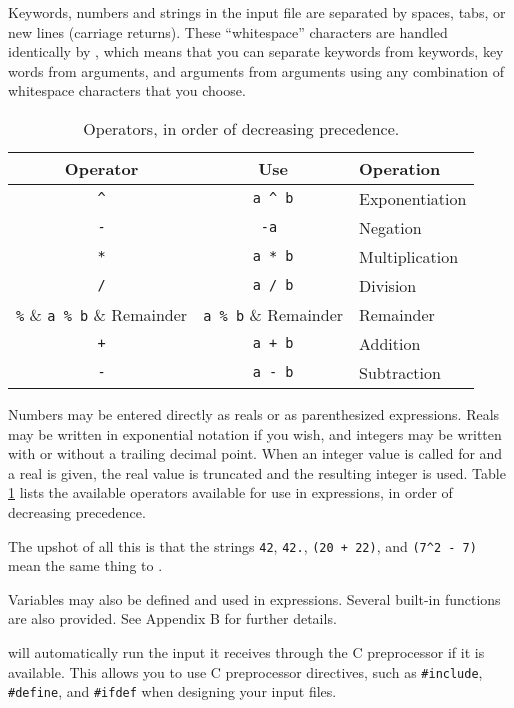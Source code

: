 Keywords, numbers and strings in the input file are separated by spaces,
tabs, or new lines (carriage returns).  These ``whitespace'' characters
are handled identically by {\rayshade}, which means that you can separate
keywords from keywords, key words from arguments, and arguments from
arguments using any combination of whitespace characters that you choose.

\begin{table}
\centering
\begin{tabular}{|c|c|l|}\hline\hline
Operator &    Use    & Operation \\ \hline \hline
\verb+^+ &  \verb!a ^ b!  & Exponentiation \\  \hline
\verb+-+ &  \verb! -a  !  & Negation  \\   \hline
\verb+*+ &  \verb!a * b!  & Multiplication  \\  \hline
\verb+/+ &  \verb!a / b!  & Division     \\  \hline
\verb+%+ &  \verb!a % b!  & Remainder    \\  \hline
\verb-+- &  \verb!a + b!  & Addition     \\ \hline
\verb+-+ &  \verb!a - b!  & Subtraction  \\ \hline \hline
\end{tabular}
\caption{Operators, in order of decreasing precedence.}
\label{tab:operators}
\end{table}

Numbers may be entered directly as reals or as parenthesized expressions.
Reals may be written in exponential notation if you wish, and
integers may be written with or without a trailing decimal point.
When an integer value is called for and a real is given,
the real value is truncated and the resulting integer is used.
Table \ref{tab:operators} lists the available operators
available for use in expressions, in order of decreasing precedence.

The upshot of all this is that the strings
{\tt 42}, {\tt 42.},
{\tt (20 + 22)}, and {\tt (7\verb!^!2 - 7)} mean the same thing
to {\rayshade}.

Variables may also be defined and used in expressions.  Several
built-in functions are also provided.  See Appendix B for further details.

{\Rayshade} will automatically run the input it receives
through the C preprocessor if it is available.  This
allows you to use C preprocessor directives, such as {\tt \#include},
{\tt \#define}, and {\tt \#ifdef} when designing your input files.

